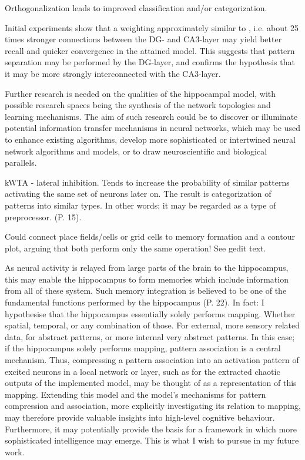 Orthogonalization leads to improved classification and/or categorization.

Initial experiments show that a weighting approximately similar to \citep{Wakagi2008}, i.e. about 25 times stronger connections between the DG- and CA3-layer may yield better recall and quicker convergence in the attained model. This suggests that pattern separation may be performed by the DG-layer, and confirms the hypothesis that it may be more strongly interconnected with the CA3-layer.

Further research is needed on the qualities of the hippocampal model, with possible research spaces being the synthesis of the network topologies and learning mechanisms. The aim of such research could be to discover or illuminate potential information transfer mechanisms in neural networks, which may be used to enhance existing algorithms, develop more sophisticated or intertwined neural network algorithms and models, or to draw neuroscientific and biological parallels.

kWTA - lateral inhibition. Tends to increase the probability of similar patterns activating the same set of neurons later on. The result is categorization of patterns into similar types. In other words; it may be regarded as a type of preprocessor. (P. 15).

Could connect place fields/cells or grid cells to memory formation and a contour plot, arguing that both perform only the same operation! See gedit text.

As neural activity is relayed from large parts of the brain to the hippocampus, this may enable the hippocampus to form memories which include information from all of these system. Such memory integration is believed to be one of the fundamental functions performed by the hippocampus (P. 22).
In fact: I hypothesise that the hippocampus essentially solely performs mapping. Whether spatial, temporal, or any combination of those. For external, more sensory related data, for abstract patterns, or more internal very abstract patterns. In this case; if the hippocampus solely performs mapping, pattern association is a central mechanism. Thus, compressing a pattern association into an activation pattern of excited neurons in a local network or layer, such as for the extracted chaotic outputs of the implemented model, may be thought of as a representation of this mapping. Extending this model and the model's mechanisms for pattern compression and association, more explicitly investigating its relation to mapping, may therefore provide valuable insights into high-level cognitive behaviour. Furthermore, it may potentially provide the basis for a framework in which more sophisticated intelligence may emerge. This is what I wish to pursue in my future work.

